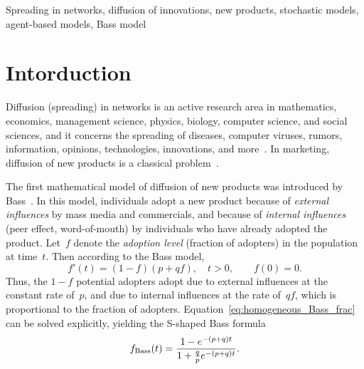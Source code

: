 \documentclass[review]{elsarticle}
\begin{document}
\begin{frontmatter}
\begin{keyword}
Spreading in networks, diffusion of innovations, new products, stochastic models, agent-based models, Bass model
\end{keyword}

\end{frontmatter}

\section{Intorduction}
Diffusion (spreading) in networks is an active research area  
in mathematics, economics, management science, physics, biology, computer science, and social sciences,
and it concerns the spreading of diseases, computer viruses, rumors, information, opinions, technologies,
innovations, and more~\citep{Albert-00,Anderson-92,Jackson-08,Pastor-Satorras-01,Strang-98}. 
In marketing, diffusion of new products is a classical problem~\citep{Mahajan-93}.

The first mathematical model of diffusion of new products
was introduced by Bass~\cite{Bass-69}.  In this model, individuals adopt a new product because
of {\em external influences} by mass media and commercials, and because of {\em internal influences} (peer effect, word-of-mouth)
by individuals who have already adopted the product.
Let~$f$ denote the {\em adoption level} (fraction of adopters) in the population at time~$t$. Then according to the Bass model, %
	\begin{equation}
		\label{eq:homogeneous_Bass_frac}
		f'(t)= \left(1-f\right)\left(p+qf\right), \quad t>0, \qquad f(0)=0.
	\end{equation}
	Thus, the $1-f$ potential adopters adopt due to external influences at the constant rate of~$p$, and due to internal influences at the rate of~$qf$, which is proportional to the fraction of adopters.
Equation~\eqref{eq:homogeneous_Bass_frac} can be solved explicitly, yielding the S-shaped Bass formula~\citep{Bass-69}
	\begin{equation}
		\label{eq:Bass_sol}
		f_{\rm Bass}(t)=\frac{1-e^{-(p+q)t}}{1+\frac{q}{p}e^{-(p+q)t}}.
	\end{equation}
\end{document}
